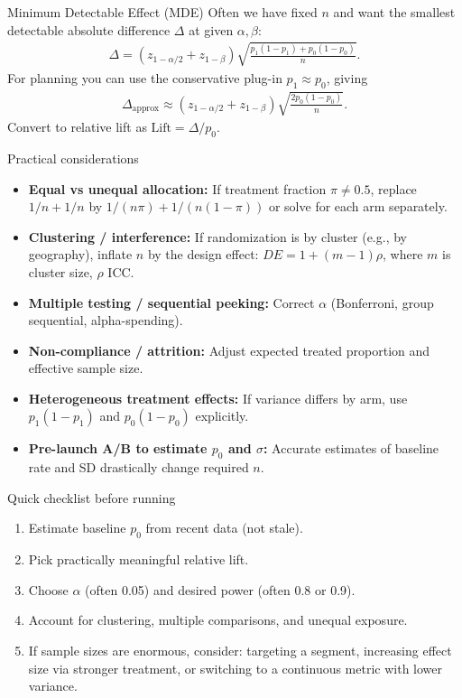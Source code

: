 \documentclass[aspectratio=169,11pt]{beamer}
\begin{document}
\begin{frame}{Minimum Detectable Effect (MDE)}
  Often we have fixed $n$ and want the smallest detectable absolute difference $\Delta$ at given $\alpha, \beta$:
  \begin{align*}
    \Delta = (z_{1-\alpha/2} + z_{1-\beta}) \sqrt{\frac{p_1(1-p_1)+p_0(1-p_0)}{n}}.
  \end{align*}
  For planning you can use the conservative plug-in $p_1\approx p_0$, giving
  \begin{align*}
    \Delta_{\text{approx}} \approx (z_{1-\alpha/2} + z_{1-\beta}) \sqrt{\frac{2 p_0(1-p_0)}{n}}.
  \end{align*}
  Convert to relative lift as $\text{Lift} = \Delta / p_0$.
\end{frame}

\begin{frame}{Practical considerations}
  \begin{itemize}
    \item \textbf{Equal vs unequal allocation:} If treatment fraction $\pi \ne 0.5$, replace $1/n+1/n$ by $1/(n\pi)+1/(n(1-\pi))$ or solve for each arm separately.
    \item \textbf{Clustering / interference:} If randomization is by cluster (e.g., by geography), inflate $n$ by the design effect: $DE = 1 + (m-1)\rho$, where $m$ is cluster size, $\rho$ ICC.
    \item \textbf{Multiple testing / sequential peeking:} Correct $\alpha$ (Bonferroni, group sequential, alpha-spending).
    \item \textbf{Non-compliance / attrition:} Adjust expected treated proportion and effective sample size.
    \item \textbf{Heterogeneous treatment effects:} If variance differs by arm, use $p_1(1-p_1)$ and $p_0(1-p_0)$ explicitly.
    \item \textbf{Pre-launch A/B to estimate $p_0$ and $\sigma$:} Accurate estimates of baseline rate and SD drastically change required $n$.
  \end{itemize}
\end{frame}

\begin{frame}{Quick checklist before running}
  \begin{enumerate}
    \item Estimate baseline $p_0$ from recent data (not stale).
    \item Pick practically meaningful \alert{relative} lift.
    \item Choose $\alpha$ (often 0.05) and desired power (often 0.8 or 0.9).
    \item Account for clustering, multiple comparisons, and unequal exposure.
    \item If sample sizes are enormous, consider: targeting a segment, increasing effect size via stronger treatment, or switching to a continuous metric with lower variance.
  \end{enumerate}
\end{frame}
\end{document}
